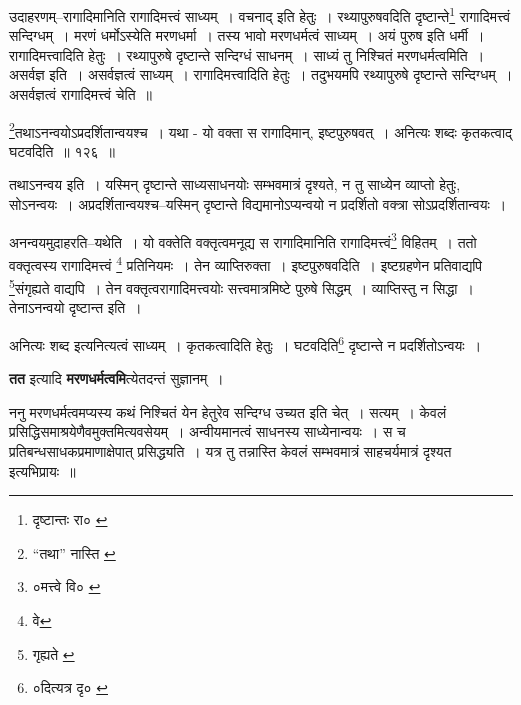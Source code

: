 \documentclass[article,12pt,a4paper]{memoir}
\begin{document}
	  \pstart उदाहरणम्--रागादिमानिति रागादिमत्त्वं साध्यम् । वचनाद् इति हेतुः । रथ्यापुरुषवदिति दृष्टान्ते\footnote{दृष्टान्तः रा० \cite{dp-msA} \cite{dp-msB} \cite{dp-msD} \cite{dp-edP} \cite{dp-edH} \cite{dp-edE} \cite{dp-edN}} रागादिमत्त्वं सन्दिग्धम् । मरणं धर्मोऽस्येति मरणधर्मा । तस्य भावो मरणधर्मत्वं साध्यम् । अयं पुरुष इति धर्मी । रागादिमत्त्वादिति हेतुः । रथ्यापुरुषे दृष्टान्ते सन्दिग्धं साधनम् । साध्यं तु निश्चितं मरणधर्मत्वमिति । असर्वज्ञ इति । असर्वज्ञत्वं साध्यम् । रागादिमत्त्वादिति हेतुः । तदुभयमपि रथ्यापुरुषे दृष्टान्ते सन्दिग्धम् । असर्वज्ञत्वं रागादिमत्त्वं चेति ॥
	\pend
       
	  \bigskip
	  \begingroup
	

	  \pstart \footnote{“तथा” नास्ति \cite{dp-msB} \cite{dp-edP} \cite{dp-edH} \cite{dp-edE} \cite{dp-edN}}तथाऽनन्वयोऽप्रदर्शितान्वयश्च । यथा - यो वक्ता स रागादिमान्, इष्टपुरुषवत् । अनित्यः शब्दः कृतकत्वाद् घटवदिति ॥ १२६ ॥
	\pend
      
	  \endgroup
	 

	  \pstart तथाऽनन्वय इति । यस्मिन् दृष्टान्ते साध्यसाधनयोः सम्भवमात्रं दृश्यते, न तु साध्येन व्याप्तो हेतुः, सोऽनन्वयः । अप्रदर्शितान्वयश्च--यस्मिन् दृष्टान्ते विद्यमानोऽप्यन्वयो न प्रदर्शितो वक्त्रा सोऽप्रदर्शितान्वयः ।
	\pend
       

	  \pstart अनन्वयमुदाहरति--यथेति । यो वक्तेति वक्तृत्वमनूद्य स रागादिमानिति रागादिमत्त्वं\footnote{०मत्त्वे वि० \cite{dp-msA}} विहितम् । ततो वक्तृत्वस्य रागादिमत्त्वं \footnote{वे} प्रतिनियमः । तेन व्याप्तिरुक्ता । इष्टपुरुषवदिति । इष्टग्रहणेन प्रतिवाद्यपि \footnote{गृह्यते \cite{dp-msA} \cite{dp-edP} \cite{dp-edH} \cite{dp-edE} \cite{dp-edN}}संगृह्यते वाद्यपि । तेन वक्तृत्वरागादिमत्त्वयोः सत्त्वमात्रमिष्टे पुरुषे सिद्धम् । व्याप्तिस्तु न सिद्धा । तेनाऽनन्वयो दृष्टान्त इति ।
	\pend
       

	  \pstart अनित्यः शब्द इत्यनित्यत्वं साध्यम् । कृतकत्वादिति हेतुः । घटवदिति\footnote{०दित्यत्र दृ० \cite{dp-msA} \cite{dp-edP} \cite{dp-edH} \cite{dp-edE}} दृष्टान्ते न प्रदर्शितोऽन्वयः ।
	\pend
      
	  \endgroup
	

	  \pstart \textbf{तत} इत्यादि \textbf{मरणधर्मत्वमि}त्येतदन्तं सुज्ञानम् ।
	\pend
      

	  \pstart ननु मरणधर्मत्वमप्यस्य कथं निश्चितं येन हेतुरेव सन्दिग्ध उच्यत इति चेत् । सत्यम् । केवलं प्रसिद्धिसमाश्रयेणैवमुक्तमित्यवसेयम् । अन्वीयमानत्वं साधनस्य साध्येनान्वयः । स च प्रतिबन्धसाधकप्रमाणाक्षेपात् प्रसिद्ध्यति । यत्र तु तन्नास्ति केवलं सम्भवमात्रं साहचर्यमात्रं दृश्यत इत्यभिप्रायः ॥
	\pend
      
\end{document}
